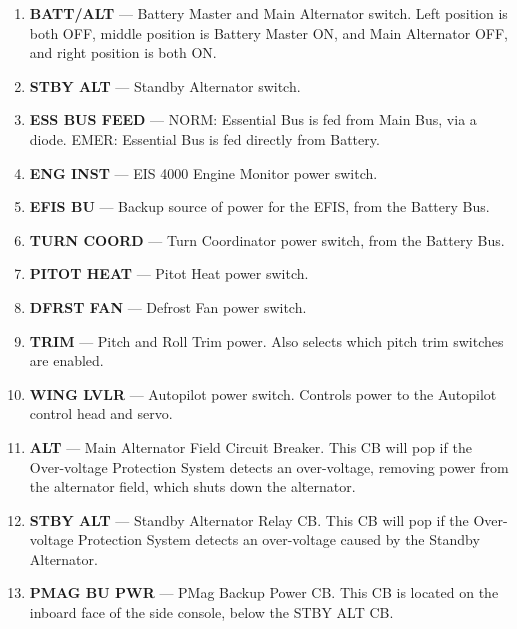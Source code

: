 \begin{enumerate}
	\item \textbf{BATT/ALT} --- Battery Master and Main Alternator switch. Left position is both OFF, middle position is Battery Master ON, and Main Alternator OFF, and right position is both ON. 
	\item \textbf{STBY ALT} --- Standby Alternator switch. 
	\item \textbf{ESS BUS FEED} --- NORM: Essential Bus is fed from Main Bus, via a diode. EMER: Essential Bus is fed directly from Battery. 
	\item \textbf{ENG INST} --- EIS 4000 Engine Monitor power switch. 
	\item \textbf{EFIS BU} --- Backup source of power for the EFIS, from the Battery Bus. 
	\item \textbf{TURN COORD} --- Turn Coordinator power switch, from the Battery Bus. 
	\item \textbf{PITOT HEAT} --- Pitot Heat power switch. 
	\item \textbf{DFRST FAN} --- Defrost Fan power switch. 
	\item \textbf{TRIM} --- Pitch and Roll Trim power. Also selects which pitch trim switches are enabled. 
	\item \textbf{WING LVLR} --- Autopilot power switch. Controls power to the Autopilot control head and servo. 
	\item \textbf{ALT} --- Main Alternator Field Circuit Breaker. This CB will pop if the Over-voltage Protection System detects an over-voltage, removing power from the alternator field, which shuts down the alternator. 
	\item \textbf{STBY ALT} --- Standby Alternator Relay CB. This CB will pop if the Over-voltage Protection System detects an over-voltage caused by the Standby Alternator. 
	\item \textbf{PMAG BU PWR} --- PMag Backup Power CB.  This CB is located on the inboard face of the side console, below the STBY ALT CB.
\end{enumerate}

\FloatBarrier

\clearpage 
